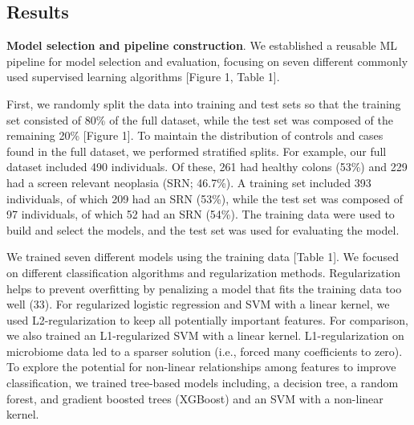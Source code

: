 \documentclass[11pt,]{article}
\begin{document}
\subsection{Results}\label{results}

\textbf{Model selection and pipeline construction}. We established a
reusable ML pipeline for model selection and evaluation, focusing on
seven different commonly used supervised learning algorithms {[}Figure
1, Table 1{]}.

First, we randomly split the data into training and test sets so that
the training set consisted of 80\% of the full dataset, while the test
set was composed of the remaining 20\% {[}Figure 1{]}. To maintain the
distribution of controls and cases found in the full dataset, we
performed stratified splits. For example, our full dataset included 490
individuals. Of these, 261 had healthy colons (53\%) and 229 had a
screen relevant neoplasia (SRN; 46.7\%). A training set included 393
individuals, of which 209 had an SRN (53\%), while the test set was
composed of 97 individuals, of which 52 had an SRN (54\%). The training
data were used to build and select the models, and the test set was used
for evaluating the model.

We trained seven different models using the training data {[}Table 1{]}.
We focused on different classification algorithms and regularization
methods. Regularization helps to prevent overfitting by penalizing a
model that fits the training data too well (33). For regularized
logistic regression and SVM with a linear kernel, we used
L2-regularization to keep all potentially important features. For
comparison, we also trained an L1-regularized SVM with a linear kernel.
L1-regularization on microbiome data led to a sparser solution (i.e.,
forced many coefficients to zero). To explore the potential for
non-linear relationships among features to improve classification, we
trained tree-based models including, a decision tree, a random forest,
and gradient boosted trees (XGBoost) and an SVM with a non-linear
kernel.
\end{document}
